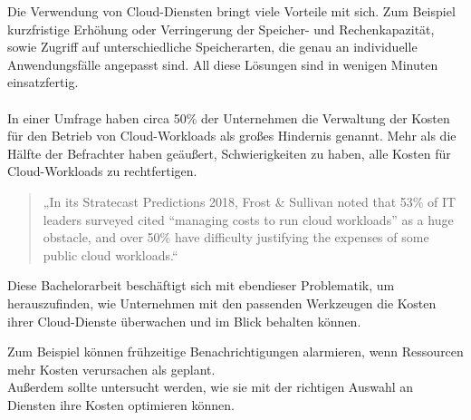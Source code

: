 \begin{comment}
\\\\
”Heute hatten wir 17 Gäste für unsere derzeit 20 Zimmer. Für die kommende Messe am Wochenende sind wir bereit 500 Gäste zu empfangen. Nach der Messe werden wir mit unseren üblichen 20 Zimmern wie immer gut arbeiten können.”
Normalerweise bräuchte man eine große Investition zu machen, um solche kurzfristige Nachfrage zu erfüllen. Vergleichbar ist es bei traditionellen IT-Infrastrukturen, mehr Kapazitätsbedarf, würde die Anschaffung von einer neuen Hardware bedeuten.
\\\\
\end{comment}
Die Verwendung von Cloud-Diensten bringt viele Vorteile mit sich. Zum Beispiel kurzfristige Erhöhung oder Verringerung der Speicher- und Rechenkapazität, sowie Zugriff auf unterschiedliche Speicherarten, die genau an individuelle Anwendungsfälle angepasst sind. All diese Lösungen sind in wenigen Minuten einsatzfertig. 
\\\\
In einer Umfrage haben circa 50\% der Unternehmen die Verwaltung der Kosten für den Betrieb von Cloud-Workloads als großes Hindernis genannt. Mehr als die Hälfte der Befrachter haben geäußert, Schwierigkeiten zu haben, alle Kosten für Cloud-Workloads zu rechtfertigen. 
\begin{quote}
    „In its Stratecast Predictions 2018, Frost \& Sullivan noted that 53\% of IT leaders surveyed cited “managing costs to run cloud workloads” as a huge obstacle, and over 50\% have difficulty justifying the expenses of some public cloud workloads.“  
    {\cite{SP1}}
    \end{quote}

\begin{flushleft}
Diese Bachelorarbeit beschäftigt sich mit ebendieser Problematik, um herauszufinden, wie Unternehmen mit den passenden Werkzeugen die Kosten ihrer Cloud-Dienste überwachen und im Blick behalten können. 

Zum Beispiel können frühzeitige Benachrichtigungen alarmieren, wenn Ressourcen mehr Kosten verursachen als geplant.
\\
Außerdem sollte untersucht werden, wie sie mit der richtigen Auswahl an Diensten ihre Kosten optimieren können.
\end{flushleft}

